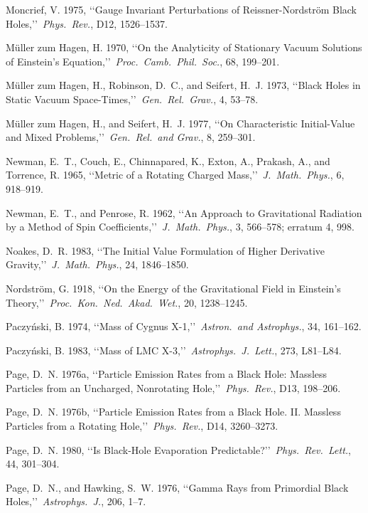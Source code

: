 \item Moncrief, V. 1975, \lq\lq Gauge Invariant Perturbations of Reissner-Nordstr{\"o}m Black Holes,\rq\rq\ \emph{Phys.\ Rev.}, D12, 1526--1537.
\item M{\"u}ller zum Hagen, H. 1970, \lq\lq On the Analyticity of Stationary Vacuum Solutions of Einstein's Equation,\rq\rq\ \emph{Proc.\ Camb.\ Phil.\ Soc.}, 68, 199--201.
\item M{\"u}ller zum Hagen, H., Robinson, D.~C., and Seifert, H.~J. 1973, \lq\lq Black Holes in Static Vacuum Space-Times,\rq\rq\ \emph{Gen.\ Rel.\ Grav.}, 4, 53--78.
\item M{\"u}ller zum Hagen, H., and Seifert, H.~J. 1977, \lq\lq On Characteristic Initial-Value and Mixed Problems,\rq\rq\ \emph{Gen.\ Rel.\ and Grav.}, 8, 259--301.

\item Newman, E.~T., Couch, E., Chinnapared, K., Exton, A., Prakash, A., and Torrence, R. 1965, \lq\lq Metric of a Rotating Charged Mass,\rq\rq\ \emph{J.\ Math.\ Phys.}, 6, 918--919.
\item Newman, E.~T., and Penrose, R. 1962, \lq\lq An Approach to Gravitational Radiation by a Method of Spin Coefficients,\rq\rq\ \emph{J.\ Math.\ Phys.}, 3, 566--578; erratum 4, 998.
\item Noakes, D.~R. 1983, \lq\lq The Initial Value Formulation of Higher Derivative Gravity,\rq\rq\ \emph{J.\ Math.\ Phys.}, 24, 1846--1850.
\item Nordstr{\"o}m, G. 1918, \lq\lq On the Energy of the Gravitational Field in Einstein's Theory,\rq\rq\ \emph{Proc.\ Kon.\ Ned.\ Akad.\ Wet.}, 20, 1238--1245.
\item Paczy\'nski, B. 1974, \lq\lq Mass of Cygnus X-1,\rq\rq\ \emph{Astron.\ and Astrophys.}, 34, 161--162.
\item Paczy\'nski, B. 1983, \lq\lq Mass of LMC X-3,\rq\rq\ \emph{Astrophys.\ J.\ Lett.}, 273, L81--L84.
\item Page, D.~N. 1976a, \lq\lq Particle Emission Rates from a Black Hole: Massless Particles from an Uncharged, Nonrotating Hole,\rq\rq\ \emph{Phys.\ Rev.}, D13, 198--206.
\item Page, D.~N. 1976b, \lq\lq Particle Emission Rates from a Black Hole. II. Massless Particles from a Rotating Hole,\rq\rq\ \emph{Phys.\ Rev.}, D14, 3260--3273.
\item Page, D.~N. 1980, \lq\lq Is Black-Hole Evaporation Predictable?\rq\rq\ \emph{Phys.\ Rev.\ Lett.}, 44, 301--304.
\item Page, D.~N., and Hawking, S.~W. 1976, \lq\lq Gamma Rays from Primordial Black Holes,\rq\rq\ \emph{Astrophys.\ J.}, 206, 1--7.
